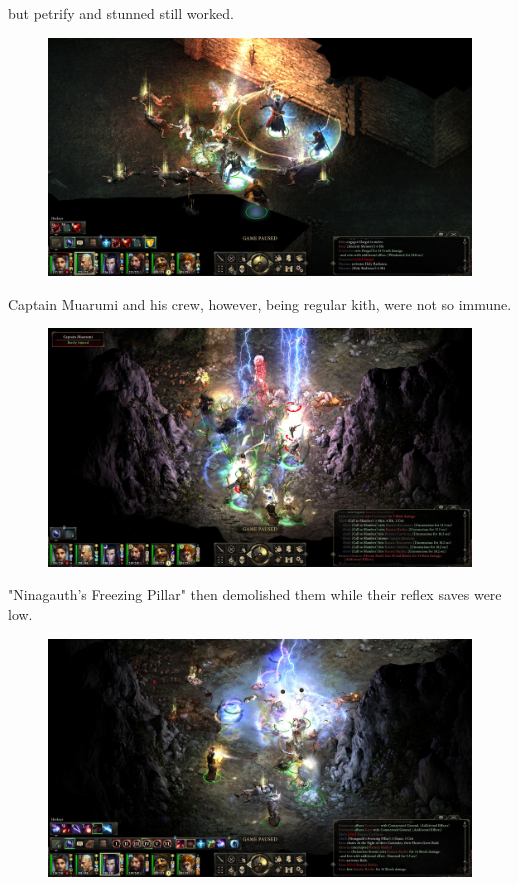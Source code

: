 \documentclass{article}
\begin{document}
but petrify and stunned still worked.

\begin{figure}
\includegraphics[scale=0.33]{files/blog/2019_03_04_pillars_of_eternity_path_of_the_damned_act_iii/2019_03_04_daroth_grimault2.jpg}
\end{figure}

Captain Muarumi and his crew, however, being regular kith, were not so immune.

\begin{figure}
\includegraphics[scale=0.33]{files/blog/2019_03_04_pillars_of_eternity_path_of_the_damned_act_iii/2019_03_04_captain_muarumi1.jpg}
\end{figure}

"Ninagauth's Freezing Pillar" then demolished them while their reflex saves were low.

\begin{figure}
\includegraphics[scale=0.33]{files/blog/2019_03_04_pillars_of_eternity_path_of_the_damned_act_iii/2019_03_04_captain_muarumi2.jpg}
\end{figure}
\end{document}
